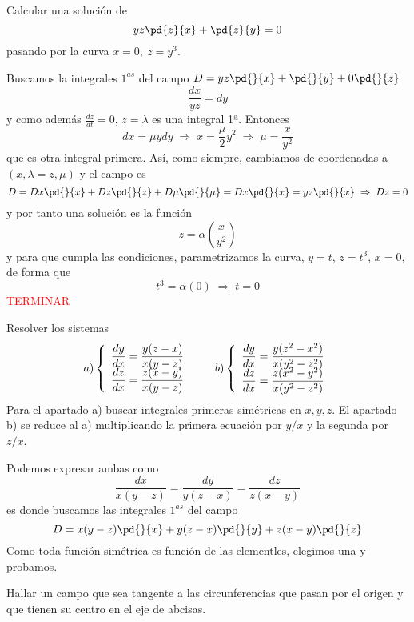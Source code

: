 \begin{ejer}[\textbf{60}] Calcular una solución de 
    $$yz\pd{z}{x}+ \pd{z}{y} = 0$$
    pasando por la curva $x=0, \: z=y^3$.
\end{ejer}
\begin{sol}
    Buscamos la integrales $1^{as}$ del campo $D=yz\pd{}{x}+\pd{}{y} + 0 \pd{}{z}$
    $$\dfrac{dx}{yz}=dy$$
    y como además $\frac{dz}{dt}=0$, $z=\lambda$ es una integral 1ª. Entonces
    $$dx=\mu y dy \; \Rightarrow \; x=\dfrac{\mu}{2} y^2 \; \Rightarrow \; \mu = \dfrac{x}{y^2}$$
    que es otra integral primera. Así, como siempre, cambiamos de coordenadas a $(x,\lambda=z, \mu)$ y el campo es $$D=Dx \pd{}{x} + Dz \pd{}{z} + D\mu \pd{}{\mu}=Dx \pd{}{x}=yz\pd{}{x} \; \Rightarrow \; Dz=0 $$
    y por tanto una solución es la función
    $$z=\alpha\left(\dfrac{x}{y^2}\right)$$
    y para que cumpla las condiciones, parametrizamos la curva, $y=t$, $z=t^3$, $x=0$, de forma que
    $$t^3=\alpha(0)  \; \Rightarrow \; t=0$$
    \textcolor{red}{TERMINAR}
\end{sol}
\begin{ejer}[\textbf{38}] Resolver los sistemas
$$a) \left\{ \begin{array}{l}
     \dfrac{dy}{dx}=\dfrac{y(z-x)}{x(y-z)}\\
     \vspace{-5mm} \\
      \dfrac{dz}{dx}=\dfrac{z(x-y)}{x(y-z)}
\end{array}\right. \qquad b) \left\{ \begin{array}{l}
     \dfrac{dy}{dx}=\dfrac{y(z^2-x^2)}{x(y^2-z^2)}\\
     \vspace{-5mm} \\
      \dfrac{dz}{dx}=\dfrac{z(x^2-y^2)}{x(y^2-z^2)}
\end{array}\right.$$
Para el apartado a) buscar integrales primeras simétricas en $x, y, z$. El apartado
b) se reduce al a) multiplicando la primera ecuación por $y/x$ y la segunda por $z/x$.    
\end{ejer}
\begin{sol}
    Podemos expresar ambas como
    $$\dfrac{dx}{x(y-z)}=\dfrac{dy}{y(z-x)}=\dfrac{dz}{z(x-y)}$$
    es donde buscamos las integrales $1^{as}$ del campo
    $$D=x(y-z)\pd{}{x} + y(z-x)\pd{}{y} + z(x-y) \pd{}{z}$$
    Como toda función simétrica es función de las elementles, elegimos una y probamos. 
\end{sol}
\begin{ejer}
    [\textbf{42}] Hallar un campo que sea tangente a las circunferencias que pasan por el origen y que tienen su centro en el eje de abcisas.
\end{ejer}

